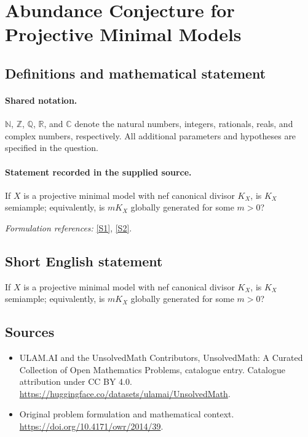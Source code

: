 \documentclass[11pt]{article}
\newcommand{\sref}[2]{\hyperlink{source:#1:#2}{[S#2]}}
\begin{document}
\section{Abundance Conjecture for Projective Minimal Models}\label{statement}

\subsection{Definitions and mathematical statement}

\paragraph{Shared notation.}$\mathbb N$, $\mathbb Z$, $\mathbb Q$, $\mathbb R$, and $\mathbb C$ denote the natural numbers, integers, rationals, reals, and complex numbers, respectively. All additional parameters and hypotheses are specified in the question.


\paragraph{Statement recorded in the supplied source.}
If $X$ is a projective minimal model with nef canonical divisor $K_X$, is $K_X$ semiample; equivalently, is $mK_X$ globally generated for some $m>0$?
\par\smallskip\textit{Formulation references:} \sref{statement}{1}, \sref{statement}{2}.
\subsection{Short English statement}
If $X$ is a projective minimal model with nef canonical divisor $K_X$, is $K_X$ semiample; equivalently, is $mK_X$ globally generated for some $m>0$?
\subsection{Sources}
\begin{itemize}
\item[\hypertarget{source:statement:1}{S1}] ULAM.AI and the UnsolvedMath Contributors, UnsolvedMath: A Curated Collection of Open Mathematics Problems, catalogue entry. Catalogue attribution under CC BY 4.0.
\url{https://huggingface.co/datasets/ulamai/UnsolvedMath}.
\item[\hypertarget{source:statement:2}{S2}] Original problem formulation and mathematical context.
\url{https://doi.org/10.4171/owr/2014/39}.
\end{itemize}
\label{end:statement}
\end{document}

